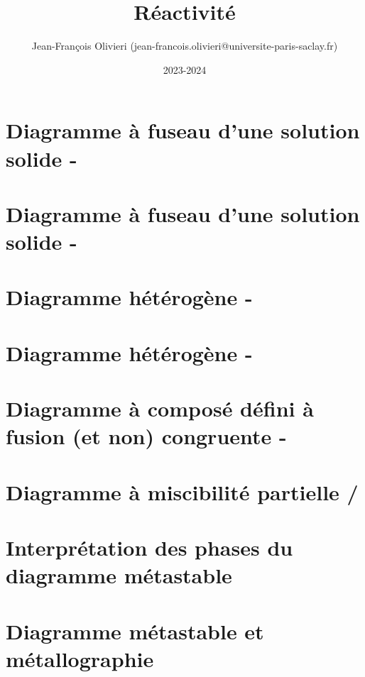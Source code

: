 \documentclass[a4paper]{article}
\title{Réactivité}
\author{Jean-François Olivieri (jean-francois.olivieri@universite-paris-saclay.fr)}
\date{2023-2024}
\theoremstyle{definition}
\newcommand*{%
\solution}[1]{}
\begin{document}
%

\section{Diagramme à fuseau d'une solution solide -}


\section{Diagramme à fuseau d'une solution solide -}


\section{Diagramme hétérogène -}


\section{Diagramme hétérogène -}


%

\section{Diagramme à composé défini à fusion (et non) congruente -}


\section{Diagramme à miscibilité partielle /}


%

%

\section{Interprétation des phases du diagramme métastable }



\section{Diagramme métastable  et métallographie}

\end{document}
